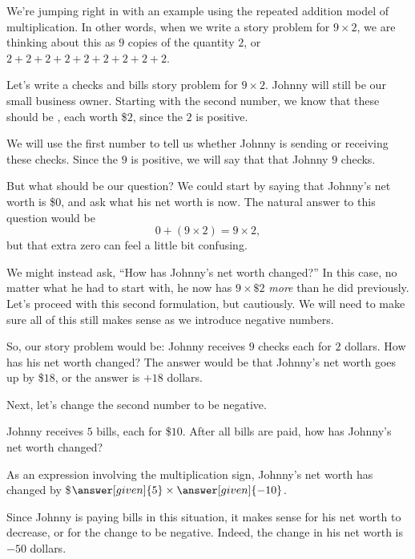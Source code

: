 \documentclass{ximera}
\begin{document}
We're jumping right in with an example using the repeated addition model of multiplication. In other words, when we write a story problem for $9 \times 2$, we are thinking about this as $9$ copies of the quantity $2$, or $2 + 2 + 2 + 2 + 2 + 2 + 2 + 2 + 2$.


\begin{example}
Let's write a checks and bills story problem for $9 \times 2$.  Johnny will still be our small business owner.  Starting with the second number, we know that these should be , each worth \$$2$, since the $2$ is positive.

We will use the first number to tell us whether Johnny is sending or receiving these checks. Since the $9$ is positive, we will say that that Johnny  $9$ checks.


But what should be our question?  We could start by saying that Johnny's net worth is \$$0$, and ask what his net worth is now.  The natural answer to this question would be
\[
0 + (9\times 2) = 9 \times 2, 
\]
but that extra zero can feel a little bit confusing.

We might instead ask, ``How has Johnny's net worth changed?''  In this case, no matter 
what he had to start with, he now has $9 \times \$2$ {\em more} than he did previously.  Let's proceed with this second formulation, but cautiously.  We will need to make sure all of this still makes sense as we introduce negative numbers.

So, our story problem would be: Johnny receives $9$ checks each for $2$ dollars. How has his net worth changed? The answer would be that Johnny's net worth goes up by \$$18$, or the answer is $+18$ dollars.

\end{example}



Next, let's change the second number to be negative.
\begin{question}
Johnny receives $5$ bills, each for \$$10$.  After all bills are paid, how has Johnny's net worth changed?

\begin{prompt}
As an expression involving the multiplication sign, Johnny's net worth has changed by \$$\answer[given]{5}\times \answer[given]{-10}$.
\end{prompt}
\end{question}
Since Johnny is paying bills in this situation, it makes sense for his net worth to decrease, or for the change to be negative. Indeed, the change in his net worth is $-50$ dollars.
\end{document}
